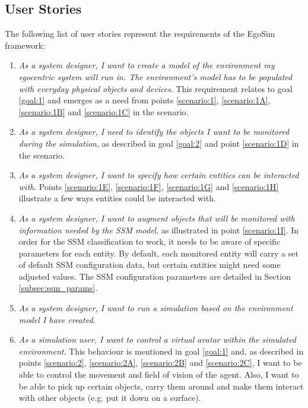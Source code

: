 \subsection{User Stories}\label{subsec:user_stories}
The following list of user stories represent the requirements of the EgoSim framework:
\begin{enumerate}
	\item[\textlabel{1.}{us:1}] \emph{As a system designer, I want to create a model of the environment my egocentric system will run in. The environment's model has to be populated with everyday physical objects and devices}. This requirement relates to goal \ref{goal:1} and emerges as a need from points \ref{scenario:1}, \ref{scenario:1A}, \ref{scenario:1B} and \ref{scenario:1C} in the scenario.

	\item[\textlabel{2.}{us:2}] \emph{As a system designer, I need to identify the objects I want to be monitored during the simulation}, as described in goal \ref{goal:2} and point \ref{scenario:1D} in the scenario.

	\item[\textlabel{2.1}{us:2.1}] \emph{As a system designer, I want to specify how certain entities can be interacted with}. Points \ref{scenario:1E}, \ref{scenario:1F}, \ref{scenario:1G} and \ref{scenario:1H} illustrate a few ways entities could be interacted with.

	\item[\textlabel{2.2.}{us:2.2}] \emph{As a system designer, I want to augment objects that will be monitored with information needed by the SSM model}, as illustrated in point \ref{scenario:1I}. In order for the SSM classification to work, it needs to be aware of specific parameters for each entity. By default, each monitored entity will carry a set of default SSM configuration data, but certain entities might need some adjusted values. The SSM configuration parameters are detailed in Section \ref{subsec:ssm_params}.

	\item[\textlabel{3.}{us:3}] \emph{As a system designer, I want to run a simulation based on the environment model I have created}.

	\item[\textlabel{4.}{us:4}] \emph{As a simulation user, I want to control a virtual avatar within the simulated environment}. This behaviour is mentioned in goal \ref{goal:1} and, as described in points \ref{scenario:2}, \ref{scenario:2A}, \ref{scenario:2B} and \ref{scenario:2C}, I want to be able to control the movement and field of vision of the agent. Also, I want to be able to pick up certain objects, carry them around and make them interact with other objects (e.g. put it down on a surface).


\end{enumerate}
